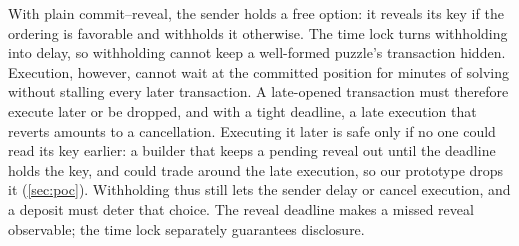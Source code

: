 With plain commit--reveal, the sender holds a free option: it reveals its key if the ordering is favorable and withholds it otherwise. The time lock turns withholding into delay, so withholding cannot keep a well-formed puzzle's transaction hidden. Execution, however, cannot wait at the committed position for minutes of solving without stalling every later transaction. A late-opened transaction must therefore execute later or be dropped, and with a tight deadline, a late execution that reverts amounts to a cancellation. Executing it later is safe only if no one could read its key earlier: a builder that keeps a pending reveal out until the deadline holds the key, and could trade around the late execution, so our prototype drops it (\cref{sec:poc}). Withholding thus still lets the sender delay or cancel execution, and a deposit must deter that choice. The reveal deadline makes a missed reveal observable; the time lock separately guarantees disclosure.
